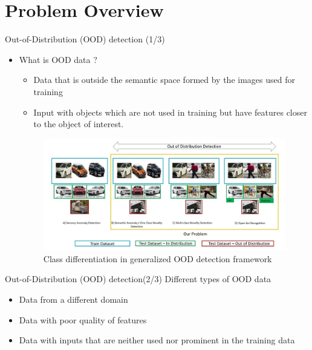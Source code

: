 \documentclass[10pt, aspectratio=169]{beamer}
\begin{document}
\section{Problem Overview}
\begin{frame}{Out-of-Distribution (OOD) detection (1/3)}
    \begin{itemize}
        \item What is OOD data ?
        \begin{itemize}
            \item Data that is outside the semantic space formed by the images used for training
            \item Input with objects which are not used in training but have features closer to the object of
            interest.
        \end{itemize}
        
        \begin{figure}
            \centering
            \includegraphics[scale=0.215]{images/OOD_vs_Non-OOD.jpg}
            \caption[\acrlong{ood} detection problem setting]{Class differentiation in generalized OOD detection framework}
            \label{fig:OOD_classes}
        \end{figure}
    \end{itemize}
\end{frame}

\begin{frame}{Out-of-Distribution (OOD) detection(2/3)}
    Different types of OOD data
    \begin{itemize}
        \item Data from a different domain
        \item Data with poor quality of features
        \item Data with inputs that are neither used nor prominent in the training data
    \end{itemize}
\end{frame}
\end{document}
